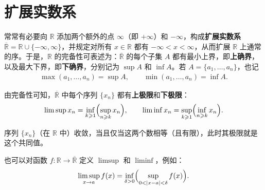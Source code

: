 \documentclass[../../main.tex]{subfiles}%
\begin{document}
\section{扩展实数系}\label{section:ch00-extended-real-numbers}


\begin{definition}[扩展实数系及其确界]\label{definition:ch00-extended-real-definition}
常常有必要向 $\mathbb{R}$ 添加两个额外的点 $\infty$（即 $+\infty$）和 $-\infty$，构成\textbf{扩展实数系} $\overline{\mathbb{R}}=\mathbb{R}\cup\{-\infty,\infty\}$，并规定对所有 $x\in\mathbb{R}$ 都有 $-\infty<x<\infty$，从而扩展 $\mathbb{R}$ 上通常的序。于是，$\mathbb{R}$ 的完备性可表述为：$\overline{\mathbb{R}}$ 的每个子集 $A$ 都有最小上界，即\textbf{上确界}，以及最大下界，即\textbf{下确界}，分别记为 $\sup A$ 和 $\inf A$。若 $A=\{a_1,\ldots,a_n\}$，也记
\begin{align*}
\max(a_1,\ldots,a_n)=\sup A,\qquad \min(a_1,\ldots,a_n)=\inf A.
\end{align*}
\end{definition}



\begin{definition}[序列的上极限与下极限]\label{definition:ch00-limsup-liminf}
由完备性可知，$\overline{\mathbb{R}}$ 中每个序列 $\{x_n\}$ 都有\textbf{上极限}和\textbf{下极限}：
\begin{align*}
\limsup x_n=\inf_{k\geqslant1}\Bigl(\sup_{n\geqslant k}x_n\Bigr),\qquad
\liminf x_n=\sup_{k\geqslant1}\Bigl(\inf_{n\geqslant k}x_n\Bigr).
\end{align*}
\end{definition}


\begin{remark}
序列 $\{x_n\}$（在 $\mathbb{R}$ 中）收敛，当且仅当这两个数相等（且有限），此时其极限就是这个共同值。
\end{remark}

\begin{definition}[函数的上极限]\label{definition:ch00-function-limsup}
也可以对函数 $f:\mathbb{R}\to\overline{\mathbb{R}}$ 定义 $\limsup$ 和 $\liminf$，例如：
\begin{align*}
\limsup_{x\to a}f(x)=\inf_{\delta>0}\Bigl(\sup_{0<|x-a|<\delta}f(x)\Bigr).
\end{align*}
\end{definition}
\end{document}
